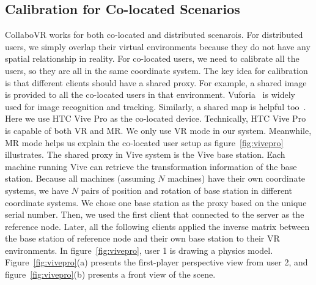 \documentclass{sigchi}
\begin{document}
\subsection{Calibration for Co-located Scenarios}
CollaboVR works for both co-located and distributed scenarois. For distributed users, we simply overlap their virtual environments because they do not have any spatial relationship in reality. For co-located users, we need to calibrate all the users, so they are all in the same coordinate system. The key idea for calibration is that different clients should have a shared proxy. For example, a shared image is provided to all the co-located users in that environment. Vuforia~\cite{Vuforia} is widely used for image recognition and tracking. Similarly, a shared map is helpful too~\cite{Hololens}. Here we use HTC Vive Pro as the co-located device. Technically, HTC Vive Pro is capable of both VR and MR. We only use VR mode in our system. Meanwhile, MR mode helps us explain the co-located user setup as figure~\ref{fig:vivepro} illustrates. The shared proxy in Vive system is the Vive base station. Each machine running Vive can retrieve the transformation information of the base station. Because all machines (assuming $N$ machines) have their own coordinate systems, we have $N$ pairs of position and rotation of base station in different coordinate systems. We chose one base station as the proxy based on the unique serial number. Then, we used the first client that connected to the server as the reference node. Later, all the following clients applied the inverse matrix between the base station of reference node and their own base station to their VR environments. In figure~\ref{fig:vivepro}, user 1 is drawing a physics model. Figure~\ref{fig:vivepro}(a) presents the first-player perspective view from user 2, and figure~\ref{fig:vivepro}(b) presents a front view of the scene.
\end{document}
